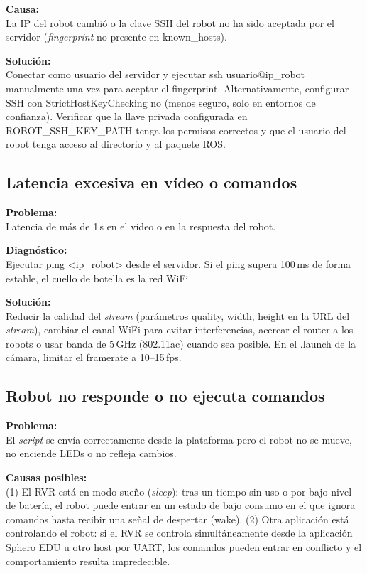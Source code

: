 \documentclass[12pt]{article}
\numberwithin{figure}{section}
\numberwithin{table}{section}
\def\code#1{#1}%
\def\file#1{#1}%
\newcommand{\code}[1]{\textcolor{codeblue}{\url{#1}}}
\newcommand{\file}[1]{\textcolor{darkblue}{\texttt{#1}}}
\begin{document}
\textbf{Causa:}\\
La IP del robot cambió o la clave SSH del robot no ha sido aceptada por el servidor (\textit{fingerprint} no presente en \file{known\_hosts}).

\textbf{Solución:}\\
Conectar como usuario del servidor y ejecutar \code{ssh usuario@ip\_robot} manualmente una vez para aceptar el fingerprint. Alternativamente, configurar SSH con \code{StrictHostKeyChecking no} (menos seguro, solo en entornos de confianza). Verificar que la llave privada configurada en \code{ROBOT\_SSH\_KEY\_PATH} tenga los permisos correctos y que el usuario del robot tenga acceso al directorio y al paquete ROS.


\subsection{Latencia excesiva en vídeo o comandos}

\textbf{Problema:}\\
Latencia de más de 1\,s en el vídeo o en la respuesta del robot.

\textbf{Diagnóstico:}\\
Ejecutar \code{ping <ip\_robot>} desde el servidor. Si el ping supera 100\,ms de forma estable, el cuello de botella es la red WiFi.

\textbf{Solución:}\\
Reducir la calidad del \textit{stream} (parámetros \code{quality}, \code{width}, \code{height} en la URL del \textit{stream}), cambiar el canal WiFi para evitar interferencias, acercar el router a los robots o usar banda de 5\,GHz (802.11ac) cuando sea posible. En el \file{.launch} de la cámara, limitar el framerate a 10--15\,fps.


\subsection{Robot no responde o no ejecuta comandos}

\textbf{Problema:}\\
El \textit{script} se envía correctamente desde la plataforma pero el robot no se mueve, no enciende LEDs o no refleja cambios.

\textbf{Causas posibles:}\\
(1) El RVR está en modo sueño (\emph{sleep}): tras un tiempo sin uso o por bajo nivel de batería, el robot puede entrar en un estado de bajo consumo en el que ignora comandos hasta recibir una señal de despertar (\code{wake}). (2) Otra aplicación está controlando el robot: si el RVR se controla simultáneamente desde la aplicación Sphero EDU u otro host por UART, los comandos pueden entrar en conflicto y el comportamiento resulta impredecible.
\end{document}
